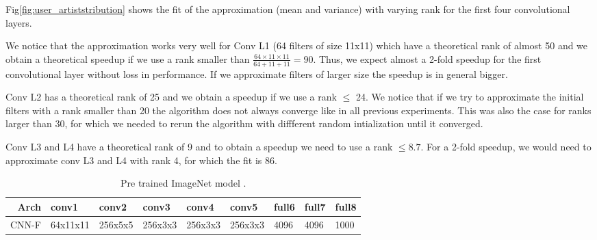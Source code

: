 Fig\ref{fig:user_artiststribution} shows the fit of the approximation (mean and variance) with varying rank for the first four convolutional layers.

We notice that the approximation works very well for Conv L1 (64 filters of size 11x11) which have a theoretical rank of almost 50 and we obtain a theoretical speedup if we use a rank smaller than $\frac{64\times 11\times 11}{64 + 11 + 11} = 90$. Thus, we expect almost a 2-fold speedup for the first convolutional layer without loss in performance. If we approximate filters of larger size the speedup is in general bigger. 

Conv L2 has a theoretical rank of 25 and we obtain a speedup if we use a rank $\leq$ 24. We notice that if we try to approximate the initial filters with a rank smaller than 20 the algorithm does not always converge like in all previous experiments. This was also the case for ranks larger than 30, for which we needed to rerun the algorithm with diffferent random intialization until it converged.

Conv L3 and L4 have a theoretical rank of 9 and to obtain a speedup we need to use a rank $\leq8.7$. For a 2-fold speedup, we would need to approximate conv L3 and L4 with rank 4, for which the fit is 86.

\begin{table}[h!]
\centering
\begin{tabular}{@{}rllllllll@{}}\toprule
Arch & conv1 & conv2&  conv3& conv4& conv5& full6& full7 &full8 \\ \midrule
CNN-F & 64x11x11 & 256x5x5& 256x3x3&256x3x3&256x3x3&4096&4096&1000\\
\end{tabular}
\caption{Pre trained ImageNet model  \cite{chatfield14return}.}
\label{fig:imagenet}
\end{table}

